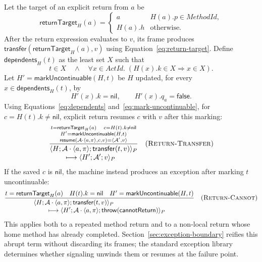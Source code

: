 \documentclass[11pt]{article}
\numberwithin{equation}{section}
\newcommand{\kw}[1]{\ensuremath{\mathsf{#1}}}
\newcommand{\nil}{\kw{nil}}
\newcommand{\rulelabel}[1]{\textsc{#1}}
\begin{document}
Let the target of an explicit return from $a$ be
\begin{equation}\label{eq:return-target}
 \mathsf{returnTarget}_H(a)=
 \begin{cases}a&H(a).p\in\mathit{MethodId},\\H(a).h&\text{otherwise.}\end{cases}
\end{equation}
After the return expression evaluates to $v$, its frame produces
$\kw{transfer}(\mathsf{returnTarget}_H(a),v)$ using
Equation~\eqref{eq:return-target}.  Define
$\mathsf{dependents}_H(t)$ as the least set $X$ such that
\begin{equation}\label{eq:dependents}
 t\in X\quad\land\quad
 \forall x\in\mathit{ActId}.\;(H(x).k\in X\Rightarrow x\in X).
\end{equation}
Let $H'=\mathsf{markUncontinuable}(H,t)$ be $H$ updated, for every
$x\in\mathsf{dependents}_H(t)$, by
\begin{equation}\label{eq:mark-uncontinuable}
 H'(x).k=\nil,\qquad H'(x).q_a=\kw{false}.
\end{equation}
Using Equations~\eqref{eq:dependents} and~\eqref{eq:mark-uncontinuable}, for
$c=H(t).k\ne\nil$, explicit return resumes $c$ with $v$ after this marking:
\[
\dfrac{\substack{t=\mathsf{returnTarget}_H(a)\quad c=H(t).k\ne\nil\\
       H'=\mathsf{markUncontinuable}(H,t)\\
       \mathsf{resume}(\mathcal A\cdot\langle a,\pi\rangle,c,v)
          =\langle\mathcal A',v\rangle}}
 {\begin{aligned}
  &\langle H;\mathcal A\cdot\langle a,\pi\rangle;
       \kw{transfer}(t,v)\rangle_P\\[-1mm]
  &\qquad\longmapsto\langle H';\mathcal A';v\rangle_P
  \end{aligned}}
\quad(\rulelabel{Return-Transfer})
\]
If the saved $c$ is $\nil$, the machine instead produces an exception after
marking $t$ uncontinuable:
\[
\dfrac{t=\mathsf{returnTarget}_H(a)\quad H(t).k=\nil\quad
       H'=\mathsf{markUncontinuable}(H,t)}
 {\begin{aligned}
  &\langle H;\mathcal A\cdot\langle a,\pi\rangle;
       \kw{transfer}(t,v)\rangle_P\\[-1mm]
  &\qquad\longmapsto
   \langle H';\mathcal A\cdot\langle a,\pi\rangle;
       \kw{throw}(\kw{cannotReturn})\rangle_P
  \end{aligned}}
\quad(\rulelabel{Return-Cannot})
\]
This applies
both to a repeated method return and to a non-local return whose home method has
already completed.  Section~\ref{sec:exception-boundary} reifies this abrupt
term without discarding its frames; the standard exception library determines
whether signaling unwinds them or resumes at the failure point.
\end{document}
